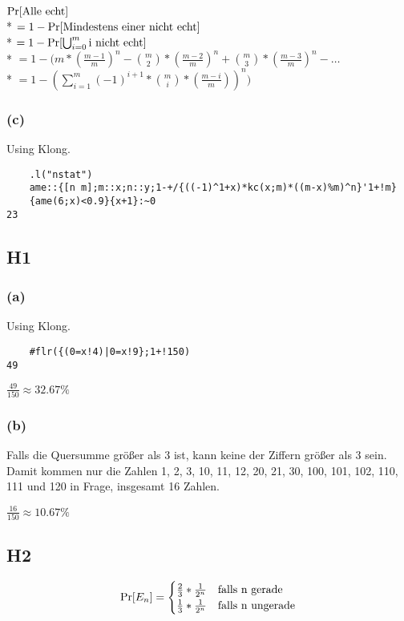 \documentclass{article}
\begin{document}
$ \Pr[\hbox{Alle echt}] $ \\*
$ = 1-\Pr[\hbox{Mindestens einer nicht echt}] $ \\*
$ = 1-\Pr[\bigcup_{i=0}^{m} \hbox{i nicht echt}] $ \\*
$ = 1-(m*(\frac{m-1}{m})^n-{m \choose 2}*(\frac{m-2}{m})^n+{m \choose3}*(\frac{m-3}{m})^n-\dots $ \\*
$ = 1-(\sum_{i=1}^{m}(-1)^{i+1}*{m \choose i}*(\frac{m-i}{m}))^n) $

\subsubsection*{(c)}

Using Klong.

\begin{lstlisting}
	.l("nstat")
	ame::{[n m];m::x;n::y;1-+/{((-1)^1+x)*kc(x;m)*((m-x)%m)^n}'1+!m}
	{ame(6;x)<0.9}{x+1}:~0
23
\end{lstlisting}

\subsection*{H1}

\subsubsection*{(a)}

Using Klong.

\begin{lstlisting}
	#flr({(0=x!4)|0=x!9};1+!150)
49
\end{lstlisting}

$\frac{49}{150} \approx 32.67\% $

\subsubsection*{(b)}

Falls die Quersumme größer als 3 ist, kann keine der Ziffern größer
als 3 sein. Damit kommen nur die Zahlen 1, 2, 3, 10, 11, 12, 20, 21,
30, 100, 101, 102, 110, 111 und 120 in Frage, insgesamt 16 Zahlen.

$\frac{16}{150} \approx 10.67\% $

\subsection*{H2}

$$\Pr[E_n]=\begin{cases}\frac{2}{3}*\frac{1}{2^n} & \hbox{falls n gerade}\cr
		  \frac{1}{3}*\frac{1}{2^n} & \hbox{falls n ungerade}\end{cases}$$
\end{document}
